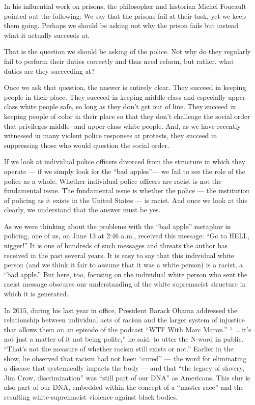 In his influential work on prisons, the philosopher and historian Michel
Foucault pointed out the following: We say that the prisons fail at
their task, yet we keep them going. Perhaps we should be asking not why
the prison fails but instead what it actually succeeds at.

That is the question we should be asking of the police. Not why do they
regularly fail to perform their duties correctly and thus need reform,
but rather, what duties are they succeeding at?

Once we ask that question, the answer is entirely clear. They succeed in
keeping people in their place. They succeed in keeping middle-class and
especially upper-class white people safe, so long as they don't get out
of line. They succeed in keeping people of color in their place so that
they don't challenge the social order that privileges middle- and
upper-class white people. And, as we have recently witnessed in many
violent police responses at protests, they succeed in suppressing those
who would question the social order.

If we look at individual police officers divorced from the structure in
which they operate --- if we simply look for the ``bad apples''--- we
fail to see the role of the police as a whole. Whether individual police
officers are racist is not the fundamental issue. The fundamental issue
is whether the police --- the institution of policing as it exists in
the United States --- is racist. And once we look at this clearly, we
understand that the answer must be yes.

As we were thinking about the problems with the ``bad apple'' metaphor
in policing, one of us, on June 13 at 2:46 a.m., received this message:
``Go to HELL, nigger!'' It is one of hundreds of such messages and
threats the author has received in the past several years. It is easy to
say that this individual white person (and we think it fair to assume
that it was a white person) is a racist, a ``bad apple.'' But here, too,
focusing on the individual white person who sent the racist message
obscures our understanding of the white supremacist structure in which
it is generated.

In 2015, during his last year in office, President Barack Obama
addressed the relationship between individual acts of racism and the
larger system of injustice that allows them on an episode of the podcast
``WTF With Marc Maron.'' `` \ldots{} it's not just a matter of it not
being polite,'' he said, to utter the N-word in public. ``That's not the
measure of whether racism still exists or not.'' Earlier in the show, he
observed that racism had not been ``cured'' --- the word for eliminating
a disease that systemically impacts the body --- and that ``the legacy
of slavery, Jim Crow, discrimination'' was ``still part of our DNA'' as
Americans. This slur is also part of our DNA, embedded within the
concept of a ``master race'' and the resulting white-supremacist
violence against black bodies.

